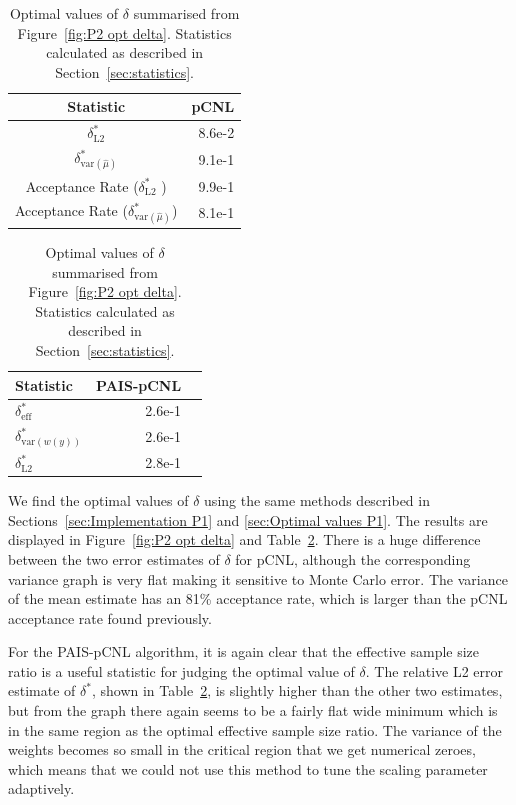 \documentclass[final]{siamltex}
\begin{document}
\begin{table}[!htb]
    \begin{minipage}{.5\linewidth}
      \centering
        \begin{tabular}{|c|r|}
	\hline
	Statistic											& pCNL \\ \hline
	$\delta_{\text{L2}}^*$								& 8.6e-2 \\
	$\delta_{\text{var}(\hat{\mu})}^*$					& 9.1e-1 \\
	Acceptance Rate ($\delta_{\text{L2}}^*$	)			& 9.9e-1 \\
	Acceptance Rate ($\delta_{\text{var}(\hat{\mu})}^*$)	& 8.1e-1 \\
	\hline
	\end{tabular}
    \end{minipage}%
    \begin{minipage}{.5\linewidth}
      \centering
        \begin{tabular}{|l|r|r|}
	\hline
	Statistic							& PAIS-pCNL \\ \hline
	$\delta_{\text{eff}}^*$				& 2.6e-1 \\
	$\delta_{\text{var}(w(y))}^*$		& 2.6e-1 \\
	$\delta_{\text{L2}}^*$				& 2.8e-1 \\
	\hline
	\end{tabular}
    \end{minipage}
	\caption{Optimal values of $\delta$ summarised from Figure~\ref{fig:P2 opt delta}. Statistics calculated as described in Section~\ref{sec:statistics}.}
	\label{table:P2 opt delta}
\end{table}

We find the optimal values of $\delta$ using the same methods described in Sections~\ref{sec:Implementation P1} and \ref{sec:Optimal values P1}. The results are displayed in Figure~\ref{fig:P2 opt delta} and Table~\ref{table:P2 opt delta}. There is a huge difference between the two error estimates of $\delta$ for pCNL, although the corresponding variance graph is very flat making it sensitive to Monte Carlo error. The variance of the mean estimate has an 81\% acceptance rate, which is larger than the pCNL acceptance rate found previously.

For the PAIS-pCNL algorithm, it is again clear that the effective sample size ratio is a useful statistic for judging the optimal value of $\delta$. The relative L2 error estimate of $\delta^*$, shown in Table~\ref{table:P2 opt delta}, is slightly higher than the other two estimates, but from the graph there again seems to be a fairly flat wide minimum which is in the same region as the optimal effective sample size ratio. The variance of the weights becomes so small in the critical region that we get numerical zeroes, which means that we could not use this method to tune the scaling parameter adaptively.
\end{document}
